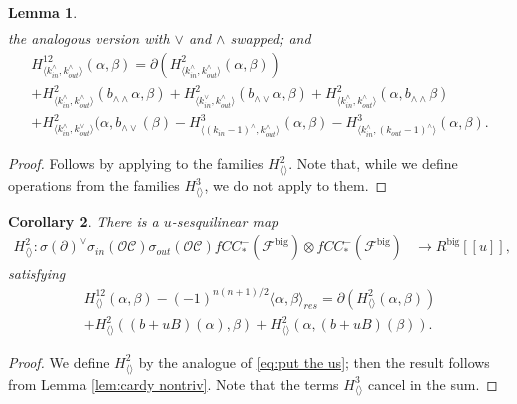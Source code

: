 \documentclass{article}
\newtheorem{lem}{Lemma}[section]
\newtheorem{cor}[lem]{Corollary}
\def\fuk{\EuF}
\def\cO{\mathcal{O}}
\def\cC{\mathcal{C}}
\def\fuk{\mathcal{F}}
\def\big{{\operatorname{big}}}
\def\signn{{n(n+1)/2}}
\begin{document}
\begin{lem}
\begin{multline}
    \end{multline}
    the analogous version with $\vee$ and $\wedge$ swapped; and
    \begin{multline}
        H^{12}_{\langle k^\wedge_{in},k^\wedge_{out}\rangle}(\alpha,\beta) = \partial(H^2_{\langle k^\wedge_{in},k^\wedge_{out}\rangle}(\alpha,\beta)) \\+ H^2_{\langle k^\wedge_{in},k^\wedge_{out}\rangle}(b_{\wedge\wedge}\alpha,\beta) + H^2_{\langle k^\vee_{in},k^\wedge_{out}\rangle}(b_{\wedge\vee}\alpha,\beta) + H^2_{\langle k^\wedge_{in},k^\wedge_{out}\rangle}(\alpha,b_{\wedge\wedge}\beta)  \\+ H^2_{\langle k_{in}^\wedge,k_{out}^\vee \rangle}(\alpha,b_{\wedge\vee}(\beta) - H^3_{\langle (k_{in}-1)^\wedge,k^\wedge_{out}\rangle}(\alpha,\beta) - H^3_{\langle k^\wedge_{in},(k_{out}-1)^\wedge\rangle}(\alpha,\beta).
    \end{multline}
\end{lem}
\begin{proof}
    Follows by applying \cite[Lemma 4.18]{relfukii} to the families $H^2_{\langle \rangle}$. Note that, while we define operations from the families $H^3_{\langle \rangle}$, we do not apply \cite[Lemma 4.18]{relfukii} to them.
\end{proof}

\begin{cor}\label{cor:cardy 2}
    There is a $u$-sesquilinear map
    \begin{align*}
        H^2_{\langle\rangle}: \sigma(\partial)^\vee\sigma_{in}(\cO\cC)\sigma_{out}(\cO\cC)fCC_*^-(\fuk^\big) \otimes fCC_*^-(\fuk^\big) & \to R^\big[[u]],
    \end{align*}
    satisfying
    \begin{multline}
H^{12}_{\langle\rangle}(\alpha,\beta) - (-1)^\signn\langle \alpha,\beta \rangle_{res} = \partial(H^2_{\langle\rangle}(\alpha,\beta)) \\+ H^2_{\langle\rangle}((b+uB)(\alpha),\beta) + H^2_{\langle\rangle}(\alpha,(b+uB)(\beta)).
    \end{multline}
\end{cor}
\begin{proof}
    We define $H^2_{\langle\rangle}$ by the analogue of \eqref{eq:put the us}; then the result follows from Lemma \ref{lem:cardy nontriv}. 
    Note that the terms $H^3_{\langle \rangle}$ cancel in the sum.
\end{proof}
\end{document}
